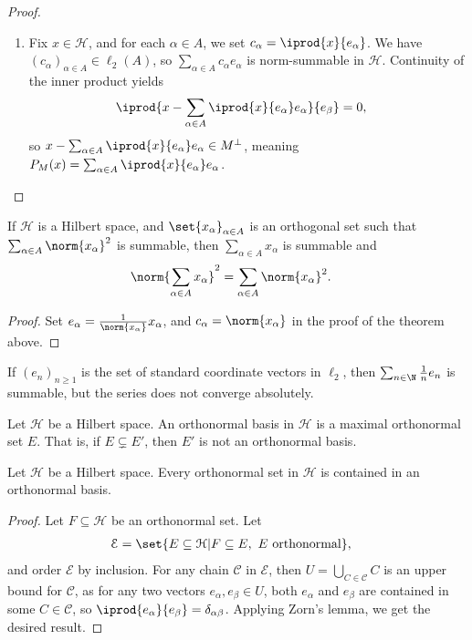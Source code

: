 \documentclass[10pt]{mypackage}
\begin{document}
\begin{proof}
\begin{enumerate}[(1)]
    \item Fix $x\in \mathcal{H}$, and for each $\alpha \in A$, we set $c_{\alpha} = \iprod{x}{e_{\alpha}}$. We have $\left(c_{\alpha}\right)_{\alpha \in A}\in \ell_2\left(A\right)$, so $\sum_{\alpha \in A}c_{\alpha}e_{\alpha}$ is norm-summable in $\mathcal{H}$. Continuity of the inner product yields
      \begin{align*}
        \iprod{x - \sum_{\alpha \in A} \iprod{x}{e_{\alpha}}e_{\alpha}}{e_{\beta}} &= 0,
      \end{align*}
      so $x - \sum_{\alpha \in A} \iprod{x}{e_{\alpha}}e_{\alpha} \in M^{\perp}$, meaning $P_{M}(x) = \sum_{\alpha \in A} \iprod{x}{e_{\alpha}}e_{\alpha}$.
  \end{enumerate}
\end{proof}
\begin{corollary}
  If $\mathcal{H}$ is a Hilbert space, and $\set{x_{\alpha}}_{\alpha\in A}$ is an orthogonal set such that $\sum_{\alpha \in A}\norm{x_{\alpha}}^2$ is summable, then $\sum_{\alpha \in A}x_\alpha$ is summable and
  \begin{align*}
    \norm{\sum_{\alpha \in A}x_{\alpha}}^2 &= \sum_{\alpha \in A}\norm{x_{\alpha}}^2.
  \end{align*}
\end{corollary}
\begin{proof}
  Set $e_{\alpha} = \frac{1}{\norm{x_{\alpha}}}x_{\alpha}$, and $c_{\alpha} = \norm{x_{\alpha}}$ in the proof of the theorem above.
\end{proof}
\begin{example}
  If $\left(e_n\right)_{n\geq 1}$ is the set of standard coordinate vectors in $\ell_2$, then $\sum_{n\in \N}\frac{1}{n}e_n$ is summable, but the series does not converge absolutely.
\end{example}
\begin{definition}
  Let $\mathcal{H}$ be a Hilbert space. An orthonormal basis in $\mathcal{H}$ is a maximal orthonormal set $E$. That is, if $E\subsetneq E'$, then $E'$ is not an orthonormal basis.
\end{definition}
\begin{lemma}
  Let $\mathcal{H}$ be a Hilbert space. Every orthonormal set in $\mathcal{H}$ is contained in an orthonormal basis.
\end{lemma}
\begin{proof}
  Let $F\subseteq \mathcal{H}$ be an orthonormal set. Let
  \begin{align*}
    \mathcal{E} &= \set{E\subseteq \mathcal{H} | F\subseteq E,~E \text{ orthonormal}},
  \end{align*}
  and order $\mathcal{E}$ by inclusion. For any chain $\mathcal{C}$ in $\mathcal{E}$, then $U = \bigcup_{C\in \mathcal{C}}C$ is an upper bound for $\mathcal{C}$, as for any two vectors $e_{\alpha},e_{\beta}\in U$, both $e_{\alpha}$ and $e_{\beta}$ are contained in some $C\in \mathcal{C}$, so $ \iprod{e_{\alpha}}{e_{\beta}} = \delta_{\alpha \beta}$. Applying Zorn's lemma, we get the desired result.
\end{proof}
\end{document}
